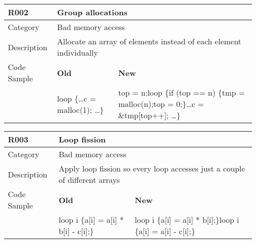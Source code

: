 \begin{tabular}{|p{0.9in}|p{2.0in}|p{2.0in}|} \hline
\textbf{R002}       & \multicolumn{2}{|p{4.0in}|}{\textbf{Group allocations}} \\ \hline
Category            & \multicolumn{2}{|p{4.0in}|}{Bad memory access} \\ \hline
Description         & \multicolumn{2}{|p{4.0in}|}{Allocate an array of elements instead of each element individually} \\ \hline
Code Sample         & \textbf{Old} & \textbf{New} \\ \hline
                    & loop \{\newline   \ldots c = malloc(1); \ldots\newline \}\newline
                    & top = n;\newline loop \{\newline   if (top == n) \{\newline     tmp = malloc(n);\newline     top = 0;\newline   \}\newline   \ldots\newline   c = \&tmp[top++]; \ldots\newline \} \\ \hline
\end{tabular}

\begin{tabular}{|p{0.9in}|p{2.0in}|p{2.0in}|} \hline
\textbf{R003} & \multicolumn{2}{|p{4.0in}|}{\textbf{Loop fission}} \\ \hline
Category            & \multicolumn{2}{|p{4.0in}|}{Bad memory access} \\ \hline
Description         & \multicolumn{2}{|p{4.0in}|}{Apply loop fission so every loop accesses just a couple of different arrays} \\ \hline
Code Sample         & \textbf{Old} & \textbf{New} \\ \hline
                    & loop i \{\newline   a[i] = a[i] * b[i] - c[i];\newline \}
                    & loop i \{\newline   a[i] = a[i] * b[i];\newline \}\newline loop i \{\newline   a[i] = a[i] - c[i];\newline \} \\ \hline
\end{tabular}

